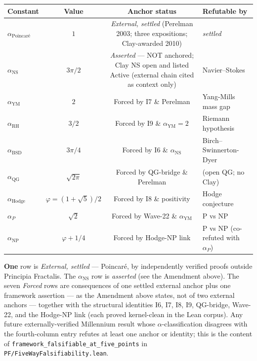 \begin{center}
\small
\begin{tabular}{lccl}
\toprule
\textbf{Constant} & \textbf{Value} & \textbf{Anchor status} & \textbf{Refutable by} \\
\midrule
$\alpha_{\text{Poincar\'e}}$ & $1$                       & \emph{External, settled} (Perelman 2003; three expositions; Clay-awarded 2010) & \textit{settled} \\
$\alpha_{\text{NS}}$         & $3\pi/2$                  & \emph{Asserted} --- NOT anchored; Clay NS open and listed Active (external chain cited as context only) & Navier--Stokes \\
$\alpha_{\text{YM}}$         & $2$                       & Forced by I7 \& Perelman & Yang-Mills mass gap \\
$\alpha_{\text{RH}}$         & $3/2$                     & Forced by I9 \& $\alpha_{\text{YM}} = 2$ & Riemann hypothesis \\
$\alpha_{\text{BSD}}$        & $3\pi/4$                  & Forced by I6 \& $\alpha_{\text{NS}}$ & Birch--Swinnerton-Dyer \\
$\alpha_{\text{QG}}$         & $\sqrt{2\pi}$             & Forced by QG-bridge \& Perelman & (open QG; no Clay) \\
$\alpha_{\text{Hodge}}$      & $\varphi = (1+\sqrt{5})/2$ & Forced by I8 \& positivity & Hodge conjecture \\
$\alpha_P$                   & $\sqrt{2}$                & Forced by Wave-22 \& $\alpha_{\text{YM}}$ & P vs NP \\
$\alpha_{\text{NP}}$         & $\varphi + 1/4$           & Forced by Hodge-NP link & P vs NP (co-refuted with $\alpha_P$) \\
\bottomrule
\end{tabular}
\end{center}

\noindent \textbf{One} row is \emph{External, settled} --- Poincar\'e, by
independently verified proofs outside Principia Fractalis. The
$\alpha_{\text{NS}}$ row is \emph{asserted} (see the Amendment above). The
seven
\emph{Forced} rows are consequences of one settled external anchor plus
one framework assertion --- as the Amendment above states, not of two external
anchors --- together with the structural identities I6, I7, I8, I9, QG-bridge,
Wave-22, and the Hodge-NP link (each proved kernel-clean in the Lean
corpus). Any
future externally-verified Millennium result whose $\alpha$-classification
disagrees with the fourth-column entry refutes at least one anchor or
identity; this is the content of
\texttt{framework\_falsifiable\_at\_five\_points} in
\texttt{PF/FiveWayFalsifiability.lean}.

